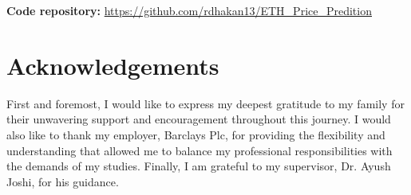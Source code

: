 \documentclass[ %
                    author={Raj Dhakan},
                supervisor={Dr. Ayush Joshi},
                    degree={MSc},
                     title={Ethereum Price Prediction using Internal and External Factors},
                  subtitle={},
                      type={},
                      year={2025}]{dissertation}
\begin{document}
\vspace{0.3cm}
\begin{center}
\noindent \textbf{Code repository:} \url{https://github.com/rdhakan13/ETH_Price_Predition}
\end{center}


\chapter*{Acknowledgements}

First and foremost, I would like to express my deepest gratitude to my family for their unwavering support and encouragement throughout this journey. I would also like to thank my employer, Barclays Plc, for providing the flexibility and understanding that allowed me to balance my professional responsibilities with the demands of my studies. Finally, I am grateful to my supervisor, Dr. Ayush Joshi, for his guidance.


\tableofcontents
\listoffigures
{}
\listoftables
{}





\end{document}
